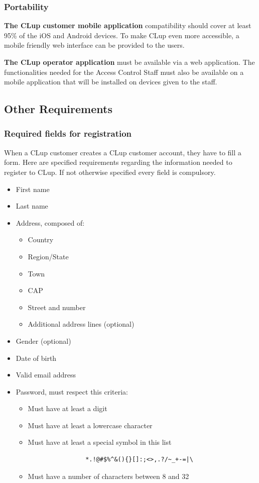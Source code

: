 \subsubsection{Portability}
\textbf{The CLup customer mobile application} compatibility should cover at least 95\% of the iOS and Android devices. To make CLup even more accessible, a mobile friendly web interface can be provided to the users.

\smallskip

\textbf{The CLup operator application} must be available via a web application. The functionalities needed for the Access Control Staff must also be available on a mobile application that will be installed on devices given to the staff.
\subsection{Other Requirements}
\subsubsection{Required fields for registration}
When a CLup customer creates a CLup customer account, they have to fill a form. Here are specified requirements regarding the information needed to register to CLup. If not otherwise specified every field is compulsory.

\begin{itemize}
    \item First name
    \item Last name
    \item Address, composed of:
          \begin{itemize}
              \item Country
              \item Region/State
              \item Town
              \item CAP
              \item Street and number
              \item Additional address lines (optional)
          \end{itemize}
    \item Gender (optional)
    \item Date of birth
    \item Valid email address
    \item Password, must respect this criteria:\label{password_req}
          \begin{itemize}
              \item Must have at least a digit
              \item Must have at least a lowercase character
              \item Must have at least a special symbol in this list
                    \begin{verbatim}
                *.!@#$%^&(){}[]:;<>,.?/~_+-=|\
                    \end{verbatim}
              \item Must have a number of characters between 8 and 32
          \end{itemize}
\end{itemize}